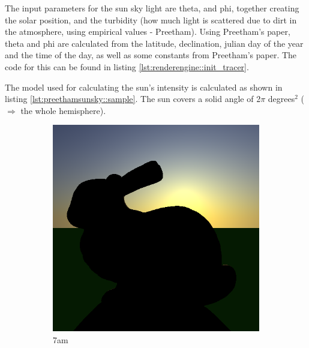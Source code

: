 \documentclass[a4paper]{article}
\begin{document}
The input parameters for the sun sky light are theta, and phi, together creating the solar position, and the turbidity (how much light is scattered due to dirt in the atmosphere, using empirical values - Preetham). Using Preetham's paper, theta and phi are calculated from the latitude, declination, julian day of the year and the time of the day, as well as some constants from Preetham's paper. The code for this can be found in listing \ref{lst:renderengine::init_tracer}.

The model used for calculating the sun's intensity is calculated as shown in listing \ref{lst:preethamsunsky::sample}. The sun covers a solid angle of 2$\pi$ degrees$^2$ ($\Rightarrow$ the whole hemisphere).

\begin{figure}[h]
	\centering
	\begin{subfigure}[b]{0.3\textwidth}
		\includegraphics[width=\textwidth]{week2/2/bunny_7.png}
		\caption{7am}
		\label{fig:skylight7}
	\end{subfigure}
	\begin{subfigure}[b]{0.3\textwidth}

\end{subfigure}
\end{figure}
\end{document}
